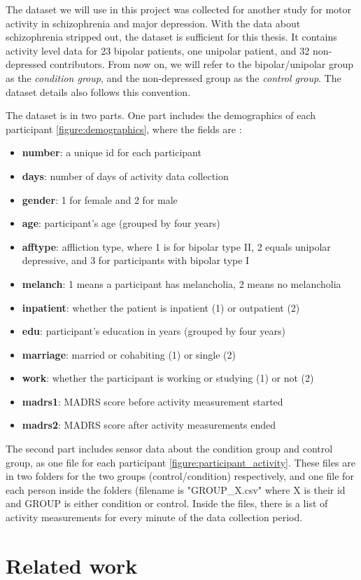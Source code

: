 The dataset we will use in this project \cite{dataset} was collected for another study for motor activity in schizophrenia and major depression. With the data about schizophrenia stripped out, the dataset is sufficient for this thesis. It contains activity level data for 23 bipolar patients, one unipolar patient, and 32 non-depressed contributors. From now on, we will refer to the bipolar/unipolar group as the \textit{condition group}, and the non-depressed group as the \textit{control group}. The dataset details \cite{dataset_details} also follows this convention.

The dataset is in two parts. One part includes the demographics of each participant \ref{figure:demographics}, where the fields are \cite{dataset_details}:

\begin{itemize}
    \item \textbf{number}: a unique id for each participant
    \item \textbf{days}: number of days of activity data collection 
    \item \textbf{gender}: 1 for female and 2 for male
    \item \textbf{age}: participant's age (grouped by four years)
    \item \textbf{afftype}: affliction type, where 1 is for bipolar type II, 2 equals unipolar depressive, and 3 for participants with bipolar type I
    \item \textbf{melanch}: 1 means a participant has melancholia, 2 means no melancholia
    \item \textbf{inpatient}: whether the patient is inpatient (1) or outpatient (2)
    \item \textbf{edu}: participant's education in years (grouped by four years)
    \item \textbf{marriage}: married or cohabiting (1) or single (2)
    \item \textbf{work}: whether the participant is working or studying (1) or not (2)
    \item \textbf{madrs1}: MADRS score before activity measurement started
    \item \textbf{madrs2}: MADRS score after activity measurements ended
\end{itemize}

The second part includes sensor data about the condition group and control group, as one file for each participant \ref{figure:participant_activity}. These files are in two folders for the two groups (control/condition) respectively, and one file for each person inside the folders (filename is "GROUP\_X.csv" where X is their id and GROUP is either condition or control. Inside the files, there is a list of activity measurements for every minute of the data collection period.

\section{Related work}


